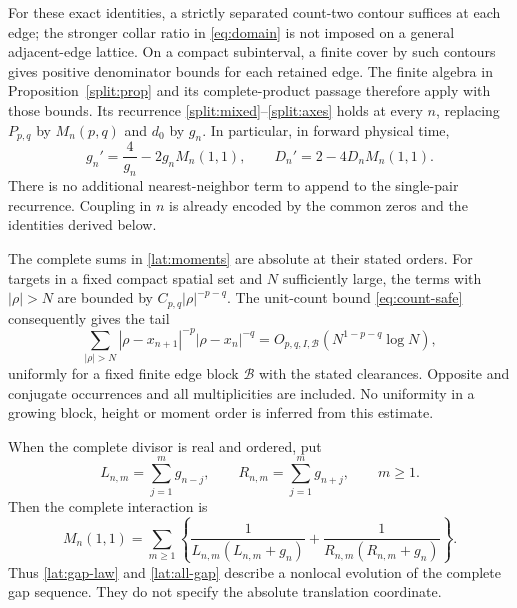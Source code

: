 For these exact identities, a strictly separated count-two contour
suffices at each edge; the stronger collar ratio in
\eqref{eq:domain} is not imposed on a general adjacent-edge lattice.
On a compact subinterval, a finite cover by such contours gives
positive denominator bounds for each retained edge. The finite
algebra in Proposition~\ref{split:prop} and its complete-product
passage therefore apply with those bounds. Its recurrence
\eqref{split:mixed}--\eqref{split:axes} holds at every $n$, replacing
$P_{p,q}$ by $M_n(p,q)$ and $d_0$ by $g_n$. In particular, in
forward physical time,
\begin{equation}
 g_n'=\frac4{g_n}-2g_nM_n(1,1),\qquad
 D_n'=2-4D_nM_n(1,1).
 \label{lat:gap-law}
\end{equation}
There is no additional nearest-neighbor term to append to the
single-pair recurrence. Coupling in $n$ is already encoded by the
common zeros and the identities derived below.

The complete sums in \eqref{lat:moments} are absolute at their stated
orders. For targets in a fixed compact spatial set and $N$ sufficiently
large, the terms with $|\rho|>N$ are bounded by
$C_{p,q}|\rho|^{-p-q}$. The unit-count bound
\eqref{eq:count-safe} consequently gives the tail
\begin{equation}
 \sum_{|\rho|>N}
 |\rho-x_{n+1}|^{-p}|\rho-x_n|^{-q}
 =O_{p,q,I,\mathcal B}(N^{1-p-q}\log N),
 \label{lat:tail}
\end{equation}
uniformly for a fixed finite edge block $\mathcal B$ with the stated
clearances. Opposite and conjugate occurrences and all multiplicities
are included. No uniformity in a growing block, height or moment order
is inferred from this estimate.

\begin{proposition}\label{lat:all-gap-prop}
When the complete divisor is real and ordered, put
\begin{equation}
 L_{n,m}=\sum_{j=1}^{m}g_{n-j},\qquad
 R_{n,m}=\sum_{j=1}^{m}g_{n+j},\qquad m\ge1.
 \label{lat:distances}
\end{equation}
Then the complete interaction is
\begin{equation}
 M_n(1,1)=\sum_{m\ge1}
 \left\{\frac1{L_{n,m}(L_{n,m}+g_n)}
       +\frac1{R_{n,m}(R_{n,m}+g_n)}\right\}.
 \label{lat:all-gap}
\end{equation}
Thus \eqref{lat:gap-law} and \eqref{lat:all-gap} describe a nonlocal
evolution of the complete gap sequence. They do not specify the
absolute translation coordinate.
\end{proposition}

